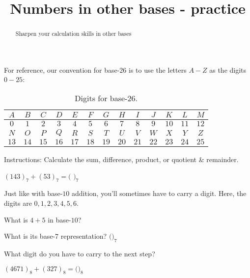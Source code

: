 \documentclass[handout,numbers]{ximera}
\title{Numbers in other bases - practice}
\begin{document}
\begin{abstract} {Sharpen your calculation skills in other bases}
\end{abstract}
\maketitle

For reference, our convention for base-$26$ is to use the letters $A-Z$ as the digits $0-25$:

\begin{table}
\centering
\caption{Digits for base-$26$.}
\begin{tabular}{|c|c|c|c|c|c|c|c|c|c|c|c|c|}
\hline
 $A$ & $B$ & $C$ & $D$ & $E$ & $F$ & $G$ & $H$ & $I$ & $J$ & $K$ & $L$ & $M$  \\
 \hline
$0$ & $1$ & $2$ & $3$ & $4$ & $5$ & $6$ & $7$ & $8$ & $9$ & $10$ & $11$ & $12$ \\
\hline
\hline
$N$ & $O$ & $P$ & $Q$ & $R$ & $S$ & $T$ & $U$ & $V$ & $W$ & $X$ & $Y$ & $Z$\\
\hline
$13$ & $14$ & $15$ & $16$ & $17$ & $18$ & $19$ & $20$ & $21$ & $22$ & $23$ & $24$ & $25$ \\
\hline
\end{tabular}
\end{table}

Instructions: Calculate the sum, difference, product, or quotient \& remainder.  

\begin{question}
	$(143)_7 + (53)_7 = ($ \qquad\qquad {}$)_7$
	\begin{hint} 
		Just like with base-$10$ addition, you'll sometimes have to carry a digit.  Here, the digits are $0, 1, 2, 3, 4, 5, 6$.

		\begin{prompt} 
			What is $4+5$ in base-$10$? \qquad\qquad {}
		\end{prompt}

		\begin{prompt} 
			What is its base-$7$ representation? $($\qquad\qquad \answer{(12)}$)_7$
		\end{prompt}

		\begin{prompt} 
			What digit do you have to carry to the next step? \answer{1}
		\end{prompt}
	\end{hint}
\end{question}

\begin{question} 
	$(4671)_8 + (327)_8 = ($\qquad\qquad {}$)_8$
\end{question}
\end{document}
